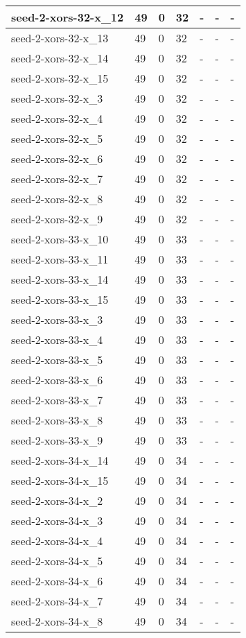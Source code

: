 \begin{scriptsize}
\begin{longtable}{|p{5cm}|l|l|l|l|l|l|}
seed-2-xors-32-x\_12&49&0&32&-&-&- \\ \hline 
seed-2-xors-32-x\_13&49&0&32&-&-&- \\ \hline 
seed-2-xors-32-x\_14&49&0&32&-&-&- \\ \hline 
seed-2-xors-32-x\_15&49&0&32&-&-&- \\ \hline 
seed-2-xors-32-x\_3&49&0&32&-&-&- \\ \hline 
seed-2-xors-32-x\_4&49&0&32&-&-&- \\ \hline 
seed-2-xors-32-x\_5&49&0&32&-&-&- \\ \hline 
seed-2-xors-32-x\_6&49&0&32&-&-&- \\ \hline 
seed-2-xors-32-x\_7&49&0&32&-&-&- \\ \hline 
seed-2-xors-32-x\_8&49&0&32&-&-&- \\ \hline 
seed-2-xors-32-x\_9&49&0&32&-&-&- \\ \hline 
seed-2-xors-33-x\_10&49&0&33&-&-&- \\ \hline 
seed-2-xors-33-x\_11&49&0&33&-&-&- \\ \hline 
seed-2-xors-33-x\_14&49&0&33&-&-&- \\ \hline 
seed-2-xors-33-x\_15&49&0&33&-&-&- \\ \hline 
seed-2-xors-33-x\_3&49&0&33&-&-&- \\ \hline 
seed-2-xors-33-x\_4&49&0&33&-&-&- \\ \hline 
seed-2-xors-33-x\_5&49&0&33&-&-&- \\ \hline 
seed-2-xors-33-x\_6&49&0&33&-&-&- \\ \hline 
seed-2-xors-33-x\_7&49&0&33&-&-&- \\ \hline 
seed-2-xors-33-x\_8&49&0&33&-&-&- \\ \hline 
seed-2-xors-33-x\_9&49&0&33&-&-&- \\ \hline 
seed-2-xors-34-x\_14&49&0&34&-&-&- \\ \hline 
seed-2-xors-34-x\_15&49&0&34&-&-&- \\ \hline 
seed-2-xors-34-x\_2&49&0&34&-&-&- \\ \hline 
seed-2-xors-34-x\_3&49&0&34&-&-&- \\ \hline 
seed-2-xors-34-x\_4&49&0&34&-&-&- \\ \hline 
seed-2-xors-34-x\_5&49&0&34&-&-&- \\ \hline 
seed-2-xors-34-x\_6&49&0&34&-&-&- \\ \hline 
seed-2-xors-34-x\_7&49&0&34&-&-&- \\ \hline 
seed-2-xors-34-x\_8&49&0&34&-&-&- \\ \hline 

\end{longtable}
\end{scriptsize}
